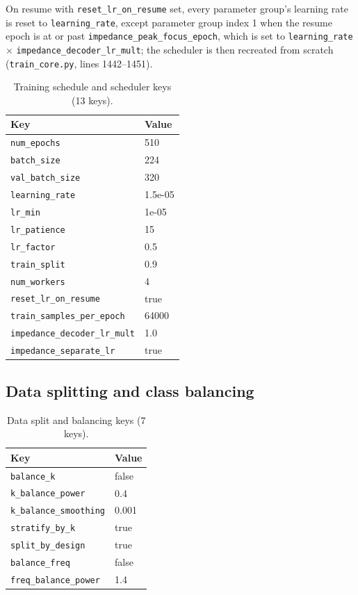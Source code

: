 On resume with \texttt{reset\_lr\_on\_resume} set, every parameter group's learning rate
is reset to \texttt{learning\_rate}, except parameter group index 1 when the resume epoch
is at or past \texttt{impedance\_peak\_focus\_epoch}, which is set to
\texttt{learning\_rate} $\times$ \texttt{impedance\_decoder\_lr\_mult}; the scheduler is
then recreated from scratch (\texttt{train\_core.py}, lines 1442--1451).

\begin{table}[htbp]
\centering
\caption{Training schedule and scheduler keys (13 keys).}
\label{tab:appb_schedule}
\begin{tabular}{@{}ll@{}}
\hline
Key & Value \\
\hline
\texttt{num\_epochs} & 510 \\
\texttt{batch\_size} & 224 \\
\texttt{val\_batch\_size} & 320 \\
\texttt{learning\_rate} & 1.5e-05 \\
\texttt{lr\_min} & 1e-05 \\
\texttt{lr\_patience} & 15 \\
\texttt{lr\_factor} & 0.5 \\
\texttt{train\_split} & 0.9 \\
\texttt{num\_workers} & 4 \\
\texttt{reset\_lr\_on\_resume} & true \\
\texttt{train\_samples\_per\_epoch} & 64000 \\
\texttt{impedance\_decoder\_lr\_mult} & 1.0 \\
\texttt{impedance\_separate\_lr} & true \\
\hline
\end{tabular}
\end{table}

\subsection{Data splitting and class balancing}
\label{subsec:appb_split}

\begin{table}[htbp]
\centering
\caption{Data split and balancing keys (7 keys).}
\label{tab:appb_split}
\begin{tabular}{@{}ll@{}}
\hline
Key & Value \\
\hline
\texttt{balance\_k} & false \\
\texttt{k\_balance\_power} & 0.4 \\
\texttt{k\_balance\_smoothing} & 0.001 \\
\texttt{stratify\_by\_k} & true \\
\texttt{split\_by\_design} & true \\
\texttt{balance\_freq} & false \\
\texttt{freq\_balance\_power} & 1.4 \\
\hline
\end{tabular}
\end{table}

